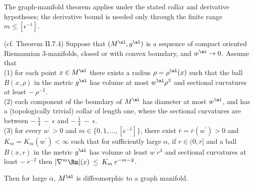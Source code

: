 \begin{remark}
\label{rem:kl-thin-part-graph-manifold-estimates-thick-thin-geometry}

The graph-manifold theorem applies under the stated collar and derivative hypotheses; the derivative bound is needed only through the finite range $m\leq[\epsilon^{-1}]$.
\end{remark}

\begin{theorem}
  \label{thm:kl-thin-part-graph-manifold-existence-thick-thin-geometry-3}
 (cf. Theorem II.7.4) \label{thmII.7.4second}
Suppose that $(M^\al, g^\al)$ is a sequence of compact oriented Riemannian
$3$-manifolds, closed or with convex boundary, and $w^\al \rightarrow 0$.
Assume that \\
(1) for each point $x \in M^\al$ there exists a radius $\rho = \rho^\al(x)$
such that
the ball $B(x, \rho)$ in the metric $g^\al$ has volume at most
$w^\al \rho^3$ and sectional curvatures at least $- \: \rho^{-2}$.\\
(2) each component of the boundary of $M^\al$ has diameter at most
$w^\al$, and has a (topologically trivial) collar of length one, where
the sectional curvatures are between $- \: \frac14 \: - \: \epsilon$ and
$- \: \frac14 \: - \: \epsilon$. \\
(3) for every $w^\prime > 0$ and $m  \in \{0, 1, \ldots, [\epsilon^{-1}]\}$,
there exist $\overline{r} = \overline{r}(w^\prime) > 0$
and $K_m = K_m(w^\prime) <\infty$ such that for sufficiently
large $\alpha$, if $r \in (0, \overline{r}]$
and a ball $B(x,r)$ in the metric $g^\al$
has volume at least $w^\prime r^3$ and sectional curvatures at least
$- \: r^{-2}$ then $|\nabla^m \Rm|(x) \: \le \: K_m \: r^{-m-2}$.

Then for large $\alpha$, $M^\al$ is diffeomorphic to a graph manifold.
\end{theorem}

\begin{remark}
\label{rem:kl-thin-part-graph-manifold-estimates-noncollapsing}
\end{remark}

